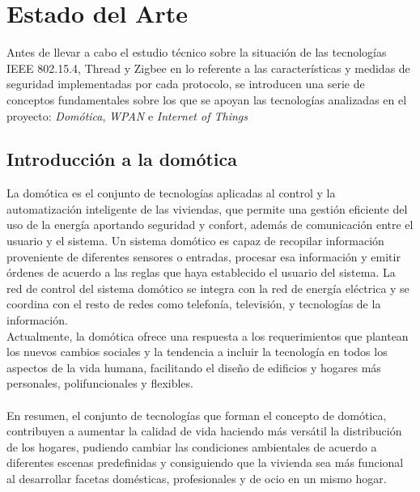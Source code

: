 \chapter{Estado del Arte} %
Antes de llevar a cabo el estudio técnico sobre la situación de las tecnologías IEEE 802.15.4, Thread y Zigbee en lo referente a las características y medidas de seguridad implementadas por cada protocolo, se introducen una serie de conceptos fundamentales sobre los que se apoyan las tecnologías analizadas en el proyecto: \textit{Domótica}, \textit{WPAN} e \textit{Internet of Things}


\section{Introducción a la domótica} %
La domótica es el conjunto de tecnologías aplicadas al control y la automatización inteligente de las viviendas, que permite una gestión eficiente del uso de la energía aportando seguridad y confort, además de comunicación entre el usuario y el sistema. Un sistema domótico es capaz de recopilar información proveniente de diferentes sensores o entradas, procesar esa información y emitir órdenes de acuerdo a las reglas que haya establecido el usuario del sistema. La red de control del sistema domótico se integra con la red de energía eléctrica y se coordina con el resto de redes como telefonía, televisión, y tecnologías de la información.
\\Actualmente, la domótica ofrece una respuesta a los requerimientos que plantean los nuevos cambios sociales y la tendencia a incluir la tecnología en todos los aspectos de la vida humana, facilitando el diseño de edificios y hogares más personales, polifuncionales y flexibles.
\\\\
En resumen, el conjunto de tecnologías que forman el concepto de domótica, contribuyen a aumentar la calidad de vida haciendo más versátil la distribución de los hogares, pudiendo cambiar las condiciones ambientales de acuerdo a diferentes escenas predefinidas y consiguiendo que la vivienda sea más funcional al desarrollar facetas domésticas, profesionales y de ocio en un mismo hogar.
\clearpage




